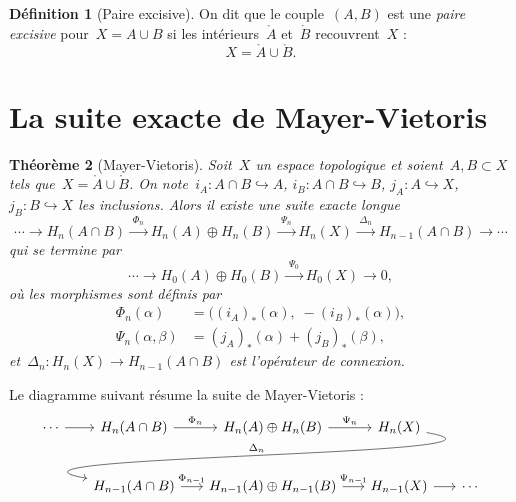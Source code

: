 \documentclass[12pt,a4paper,openany]{book}
\theoremstyle{definition}
\newtheorem{definition}{Définition}[chapter]
\theoremstyle{plain}
\newtheorem{theoreme}[definition]{Théorème}
\theoremstyle{remark}
\begin{document}
\begin{definition}[Paire excisive]\label{def:paire-excisive}
On dit que le couple~$(A, B)$ est une \emph{paire excisive} pour~$X = A \cup B$ si
les intérieurs~$\mathring{A}$ et~$\mathring{B}$ recouvrent~$X$ :
\[
  X = \mathring{A} \cup \mathring{B}.
\]
\end{definition}

\section{La suite exacte de Mayer-Vietoris}\label{sec:mv-enonce}

\begin{theoreme}[Mayer-Vietoris]\label{thm:mayer-vietoris}
Soit~$X$ un espace topologique et soient~$A, B \subset X$ tels que~$X = \mathring{A} \cup
\mathring{B}$. On note~$i_A \colon A \cap B \hookrightarrow A$,
$i_B \colon A \cap B \hookrightarrow B$, $j_A \colon A \hookrightarrow X$,
$j_B \colon B \hookrightarrow X$ les inclusions. Alors il existe une suite exacte longue
\[
\cdots \longrightarrow H_n(A \cap B)
\xrightarrow{\;\Phi_n\;} H_n(A) \oplus H_n(B)
\xrightarrow{\;\Psi_n\;} H_n(X)
\xrightarrow{\;\Delta_n\;} H_{n-1}(A \cap B) \longrightarrow \cdots
\]
qui se termine par
\[
\cdots \longrightarrow H_0(A) \oplus H_0(B) \xrightarrow{\;\Psi_0\;} H_0(X)
\longrightarrow 0,
\]
où les morphismes sont définis par
\begin{align}
  \Phi_n(\alpha) &= \bigl((i_A)_*(\alpha),\; -(i_B)_*(\alpha)\bigr),
    \label{eq:mv-phi}\\
  \Psi_n(\alpha, \beta) &= (j_A)_*(\alpha) + (j_B)_*(\beta),
    \label{eq:mv-psi}
\end{align}
et~$\Delta_n \colon H_n(X) \to H_{n-1}(A \cap B)$ est l'opérateur de connexion.
\end{theoreme}

Le diagramme suivant résume la suite de Mayer-Vietoris :
\[
\begin{tikzcd}[column sep=1.6em, row sep=2.5em]
  \cdots \ar[r]
  & H_n(A \cap B) \ar[r, "\Phi_n"]
  & H_n(A) \oplus H_n(B) \ar[r, "\Psi_n"]
  & H_n(X) \ar[dll, "\Delta_n"', out=-10, in=170, overlay]\\
  & H_{n-1}(A \cap B) \ar[r, "\Phi_{n-1}"]
  & H_{n-1}(A) \oplus H_{n-1}(B) \ar[r, "\Psi_{n-1}"]
  & H_{n-1}(X) \ar[r]
  & \cdots
\end{tikzcd}
\]
\end{document}
